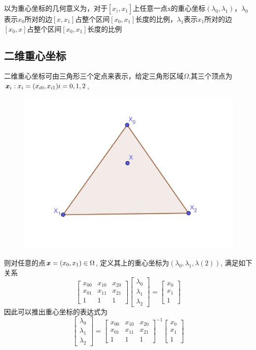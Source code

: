 以为重心坐标的几何意义为，对于$[x_),x_1]$上任意一点x的重心坐标$(\lambda_{0},\lambda_{1})$，$\lambda_{0}$表示$x_0$所对的边$[x,x_1]$占整个区间$[x_0,x_1]$长度的比例，$\lambda_{1}$表示$x_1$所对的边$[x_0,x]$占整个区间$[x_0,x_1]$长度的比例


\subsection{二维重心坐标}
二维重心坐标可由三角形三个定点来表示，给定三角形区域$\Omega$,其三个顶点为 ${{\boldsymbol x}_i:x_i=(x_{i0},x_{i1})}i=0,1,2$,
\begin{figure}[H]
	\centering
	\includegraphics[width=0.7\linewidth]{figures/trianglebc}
	\label{fig:intervalbc}
\end{figure}
则对任意的点${\boldsymbol x}=(x_0,x_1)\in \Omega$, 定义其上的重心坐标为$(\lambda_0,\lambda_1,\lambda(2))$, 满足如下关系
\begin{equation}
	\left[\begin{array}{ccc}
		x_{00} & x_{10} & x_{20} \\
		x_{01} & x_{11} & x_{21} \\
		1 & 1 & 1
	\end{array}\right]\left[\begin{array}{l}
		\lambda_{0} \\
		\lambda_{1} \\
		\lambda_{2}
	\end{array}\right]=\left[\begin{array}{c}
		x_{0} \\
		x_{1} \\
		1
	\end{array}\right]
\end{equation}
因此可以推出重心坐标的表达式为
\begin{equation}
	\left[\begin{array}{l}
		\lambda_{0} \\
		\lambda_{1} \\
		\lambda_{2}
	\end{array}\right] =
	\left[\begin{array}{ccc}
		x_{00} & x_{10} & x_{20} \\
		x_{01} & x_{11} & x_{21} \\
		1 & 1 & 1
	\end{array}\right]^{-1}
	\left[\begin{array}{c}
		x_{0} \\
		x_{1} \\
		1
	\end{array}\right]
\end{equation}

